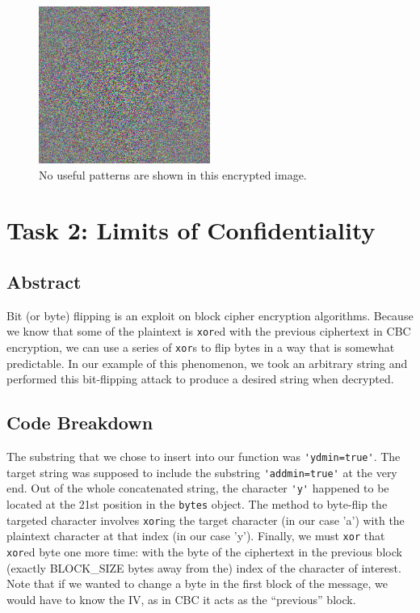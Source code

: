 \documentclass[11pt]{article}
\begin{document}
\begin{figure}[!ht]
	\centering
	\includegraphics[width=0.5\textwidth]{./assets/cbc_encrypted.jpg}
	\caption{No useful patterns are shown in this encrypted image.}
	\label{fig:cbc}
\end{figure}

\section*{Task 2: Limits of Confidentiality}
\subsection*{Abstract}

Bit (or byte) flipping is an exploit on block cipher encryption algorithms. Because we know that some of the plaintext is \verb|xor|ed with the previous ciphertext in CBC encryption, we can use a series of \verb|xor|s to flip bytes in a way that is somewhat predictable. In our example of this phenomenon, we took an arbitrary string and performed this bit-flipping attack to produce a desired string when decrypted.

\subsection*{Code Breakdown}

The substring that we chose to insert into our function was \verb|'ydmin=true'|. The target string was supposed to include the substring \verb|'addmin=true'| at the very end. Out of the whole concatenated string, the character \verb|'y'| happened to be located at the 21st position in the \verb|bytes| object. The method to byte-flip the targeted character involves \verb|xor|ing the target character (in our case 'a') with the plaintext character at that index (in our case 'y'). Finally, we must \verb|xor| that \verb|xor|ed byte one more time: with the byte of the ciphertext in the previous block (exactly BLOCK\_SIZE bytes away from the) index of the character of interest. Note that if we wanted to change a byte in the first block of the message, we would have to know the IV, as in CBC it acts as the ``previous'' block.
\end{document}
